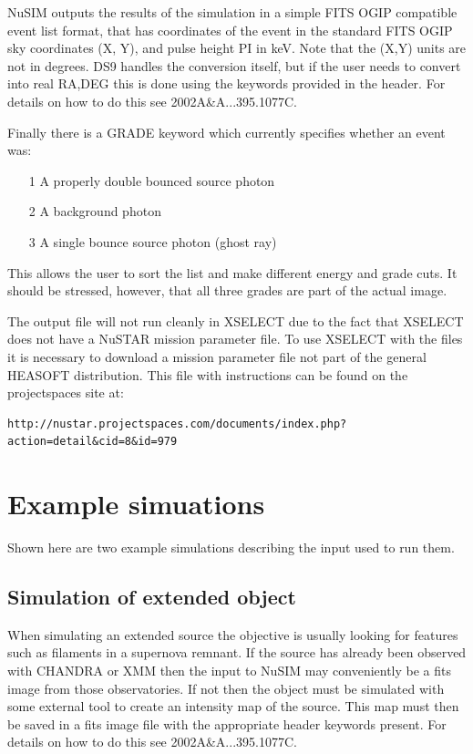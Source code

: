 NuSIM outputs the results of the simulation in a simple FITS OGIP compatible event list format, that has coordinates of the event in the standard FITS OGIP sky coordinates (X, Y), and pulse height PI in keV. Note that the (X,Y) units are not in degrees. DS9 handles the conversion itself, but if the user needs to convert into real RA,DEG this is done using the keywords provided in the header. For details on how to do this see 2002A\&A...395.1077C.


Finally there is a GRADE keyword which currently specifies whether an event was:
\begin{itemize}
\item[1] A properly double bounced source photon
\item[2] A background photon
\item[3] A single bounce source photon (ghost ray)
\end{itemize} 

This allows the user to sort the list and make different energy and grade cuts. It should be stressed, however, that all three grades are part of the actual image.

The output file will not run cleanly in XSELECT due to the fact that XSELECT does not have a NuSTAR mission parameter file. To use XSELECT with the files it is necessary to download a mission parameter file not part of the general HEASOFT distribution. This file with instructions can be found on the projectspaces site at:
\begin{verbatim}
http://nustar.projectspaces.com/documents/index.php?action=detail&cid=8&id=979
\end{verbatim}


\section{Example simuations}
Shown here are two example simulations describing the input used to run them.

\subsection{Simulation of extended object}
When simulating an extended source the objective is usually looking for features such as filaments in a supernova remnant. If the source has already been observed with CHANDRA or XMM then the input to NuSIM may conveniently be a fits image from those observatories. If not then the object must be simulated with some external tool to create an intensity map of the source. This map must then be saved in a fits image file with the appropriate header keywords present. For details on how to do this see 2002A\&A...395.1077C.

